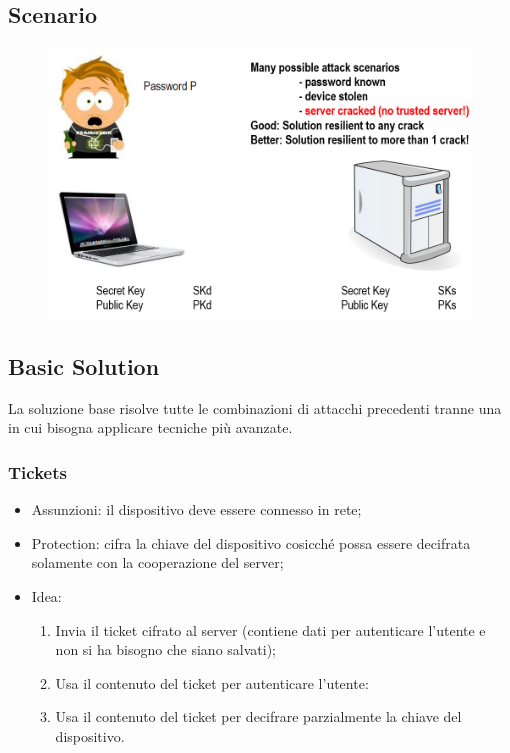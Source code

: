 \documentclass{book}
\begin{document}
\subsection{Scenario}
\begin{figure}[h]
	\centering
	\includegraphics[scale=0.5]{2022-01-06-16-43-18.png}%
\end{figure}
\subsection{Basic Solution}
La soluzione base risolve tutte le combinazioni di attacchi precedenti tranne una in cui bisogna applicare tecniche più avanzate.
\subsubsection{Tickets}
\begin{itemize}
	\item Assunzioni: il dispositivo deve essere connesso in rete;
	\item Protection: cifra la chiave del dispositivo cosicché possa essere decifrata solamente con la cooperazione del server;
	\item Idea: \begin{enumerate}
		      \item Invia il ticket cifrato al server (contiene dati per autenticare l'utente e non si ha bisogno che siano salvati);
		      \item Usa il contenuto del ticket per autenticare l'utente:
		      \item Usa il contenuto del ticket per decifrare parzialmente la chiave del dispositivo.
	      \end{enumerate}
\end{itemize}
\end{document}
